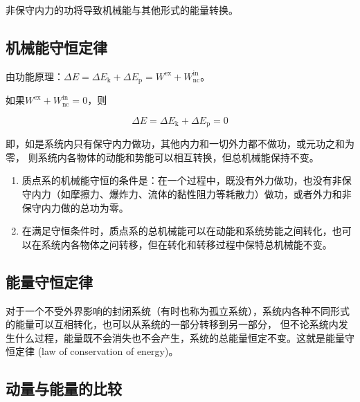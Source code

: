 \documentclass[12pt, a4paper]{article}
\numberwithin{equation}{section}
\begin{document}
    非保守内力的功将导致机械能与其他形式的能量转换。

\subsection{机械能守恒定律}

    由功能原理：$\Delta E = \Delta E_{\mathrm{k}} + \Delta E_{\mathrm{p}} =
    W^{\mathrm{ex}} + W_{\mathrm{nc}}^{\mathrm{in}}$。

    如果$W^{\mathrm{ex}} + W_{\mathrm{nc}}^{\mathrm{in}} = 0$，则

    \[
        \Delta E = \Delta E_{\mathrm{k}} + \Delta E_{\mathrm{p}} = 0
    \]

    即，如是系统内只有保守内力做功，其他内力和一切外力都不做功，或元功之和为零，
    则系统内各物体的动能和势能可以相互转换，但总机械能保持不变。

    \begin{enumerate}
        \item 质点系的机械能守恒的条件是：在一个过程中，既没有外力做功，也没有非保守内力（如摩擦力、爆炸力、流体的黏性阻力等耗散力）做功，或者外力和非保守内力做的总功为零。
        \item 在满足守恒条件时，质点系的总机械能可以在动能和系统势能之间转化，也可以在系统内各物体之问转移，但在转化和转移过程中保特总机械能不变。
    \end{enumerate}

\subsection{能量守恒定律}

    对于一个不受外界影响的封闭系统（有时也称为孤立系统），系统内各种不同形式的能量可以互相转化，也可以从系统的一部分转移到另一部分，
    但不论系统内发生什么过程，能量既不会消失也不会产生，系统的总能量恒定不变。这就是能量守恒定律 (law of conservation of energy)。

\subsection{动量与能量的比较}
\end{document}
